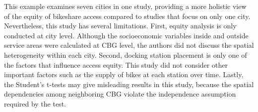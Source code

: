 \documentclass[11pt]{article}
\begin{document}

This example examines seven cities in one study, providing a more holistic view of the equity of bikeshare access compared to studies that focus on only one city. Nevertheless, this study has several limitations. First, equity analysis is only conducted at city level. Although the socioeconomic variables inside and outside service areas were calculated at CBG level, the authors did not discuss the spatial heterogeneity within each city. Second, docking station placement is only one of the factors that influence access equity. This study did not consider other important factors such as the supply of bikes at each station over time. Lastly, the Student’s t-tests may give misleading results in this study, because the spatial dependencies among neighboring CBG violate the independence assumption required by the test. 

\end{document}

